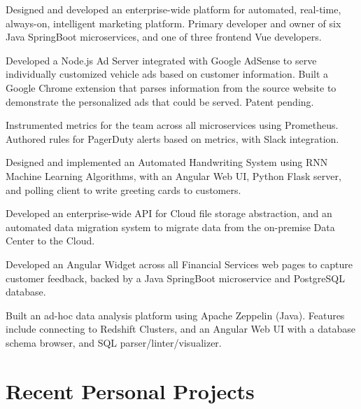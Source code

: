 \documentclass[letterpaper]{deedy-resume-openfont} %
\begin{document}
\begin{tightemize}
\item Designed and developed an enterprise-wide platform for automated, real-time, always-on, intelligent marketing platform. Primary developer and owner of six Java SpringBoot microservices, and one of three frontend Vue developers.
\item Developed a Node.js Ad Server integrated with Google AdSense to serve individually customized vehicle ads based on customer information. Built a Google Chrome extension that parses information from the source website to demonstrate the personalized ads that could be served. Patent pending.
\item Instrumented metrics for the team across all microservices using Prometheus. Authored rules for PagerDuty alerts based on metrics, with Slack integration.
\item Designed and implemented an Automated Handwriting System using RNN Machine Learning Algorithms, with an Angular Web UI, Python Flask server, and polling client to write greeting cards to customers.
\item Developed an enterprise-wide API for Cloud file storage abstraction, and an automated data migration system to migrate data from the on-premise Data Center to the Cloud.
\end{tightemize}

\sectionsep %


\begin{tightemize}
\item Developed an Angular Widget across all Financial Services web pages to capture customer feedback, backed by a Java SpringBoot microservice and PostgreSQL database.
\item Built an ad-hoc data analysis platform using Apache Zeppelin (Java). Features include connecting to Redshift Clusters, and an Angular Web UI with a database schema browser, and SQL parser/linter/visualizer.
\end{tightemize}

\sectionsep %
\sectionsep %


\section{Recent Personal Projects}
\sectionsep
\end{document}
